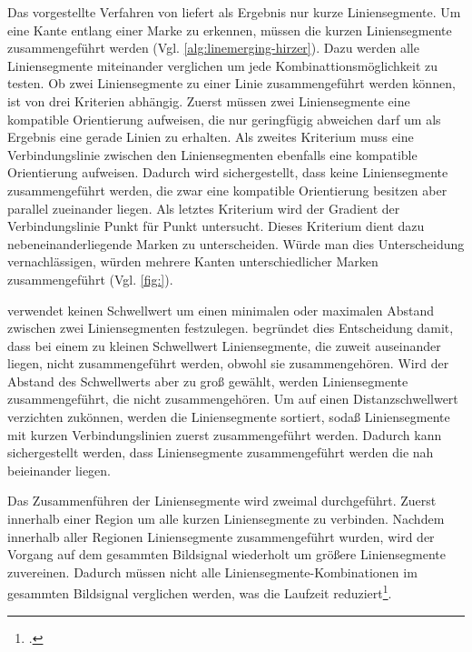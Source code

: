Das vorgestellte Verfahren von \citeauthor{clarke96} liefert als Ergebnis nur kurze Liniensegmente. Um eine Kante
 entlang einer Marke zu erkennen, müssen die kurzen Liniensegmente zusammengeführt werden
 (Vgl. \autoref{alg:linemerging-hirzer}). Dazu werden alle Liniensegmente miteinander verglichen um jede
 Kombinattionsmöglichkeit zu testen. Ob zwei Liniensegmente zu einer Linie zusammengeführt werden können, ist von drei
 Kriterien abhängig. Zuerst müssen zwei Liniensegmente eine kompatible Orientierung aufweisen, die nur geringfügig
 abweichen darf um als Ergebnis eine gerade Linien zu erhalten. Als zweites Kriterium muss eine Verbindungslinie
 zwischen den Liniensegmenten ebenfalls eine kompatible Orientierung aufweisen. Dadurch wird sichergestellt, dass keine
 Liniensegmente zusammengeführt werden, die zwar eine kompatible Orientierung besitzen aber parallel zueinander liegen.
 Als letztes Kriterium wird der Gradient der Verbindungslinie Punkt für Punkt untersucht. Dieses Kriterium dient dazu
 nebeneinanderliegende Marken zu unterscheiden. Würde man dies Unterscheidung vernachlässigen, würden mehrere Kanten
 unterschiedlicher Marken zusammengeführt (Vgl. \autoref{fig:}).

\citeauthor{hirzer08} verwendet keinen Schwellwert um einen minimalen oder maximalen Abstand zwischen zwei
 Liniensegmenten festzulegen. \citeauthor{hirzer08} begründet dies Entscheidung damit, dass bei einem zu kleinen
 Schwellwert Liniensegmente, die zuweit auseinander liegen, nicht zusammengeführt werden, obwohl sie zusammengehören.
 Wird der Abstand des Schwellwerts aber zu groß gewählt, werden Liniensegmente zusammengeführt, die nicht
 zusammengehören. Um auf einen Distanzschwellwert verzichten zukönnen, werden die Liniensegmente sortiert, sodaß
 Liniensegmente mit kurzen Verbindungslinien zuerst zusammengeführt werden. Dadurch kann sichergestellt werden, dass
 Liniensegmente zusammengeführt werden die nah beieinander liegen.

Das Zusammenführen der Liniensegmente wird zweimal durchgeführt. Zuerst innerhalb einer Region um alle kurzen
 Liniensegmente zu verbinden. Nachdem innerhalb aller Regionen Liniensegmente zusammengeführt wurden, wird der Vorgang
 auf dem gesammten Bildsignal wiederholt um größere Liniensegmente zuvereinen. Dadurch müssen nicht alle
 Liniensegmente-Kombinationen im gesammten Bildsignal verglichen werden, was die Laufzeit
 reduziert\footcite[Vgl.][S.~10]{hirzer08}.



